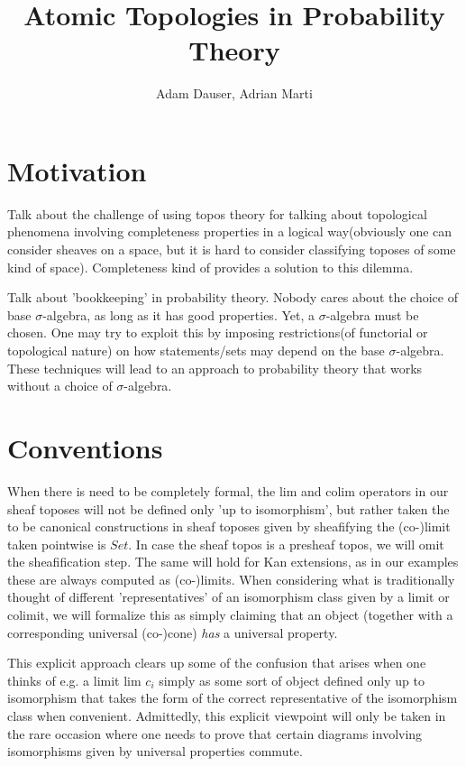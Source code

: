 \documentclass[a4paper]{amsproc}
\title{\textbf{Atomic Topologies in Probability Theory}}
\author{Adam Dauser, Adrian Marti}
\date{}
\theoremstyle{plain}
\theoremstyle{definition}
\theoremstyle{remark}
\numberwithin{equation}{section}
\begin{document}
\maketitle 

\section{Motivation}

Talk about the challenge of using topos theory for talking about topological phenomena involving completeness properties in a logical way(obviously one can consider sheaves on a space, but it is hard to consider classifying toposes of some kind of space). Completeness kind of provides a solution to this dilemma.

Talk about 'bookkeeping' in probability theory. Nobody cares about the choice of base $\sigma$-algebra, as long as it has good properties. Yet, a $\sigma$-algebra must be chosen. One may try to exploit this by imposing restrictions(of functorial or topological nature) on how statements/sets may depend on the base $\sigma$-algebra. These techniques will lead to an approach to probability theory that works without a choice of $\sigma$-algebra.

\section{Conventions} \label{conventions}

When there is need to be completely formal, the lim and colim operators in our sheaf toposes will not be defined only 'up to isomorphism', but rather taken the to be canonical constructions in sheaf toposes given by sheafifying the (co-)limit taken pointwise is $Set$. In case the sheaf topos is a presheaf topos, we will omit the sheafification step. The same will hold for Kan extensions, as in our examples these are always computed as (co-)limits. When considering what is traditionally thought of different 'representatives' of an isomorphism class given by a limit or colimit, we will formalize this as simply claiming that an object (together with a corresponding universal (co-)cone) \emph{has} a universal property.

This explicit approach clears up some of the confusion that arises when one thinks of e.g. a limit $\text{lim } c_i$ simply as some sort of object defined only up to isomorphism that takes the form of the correct representative of the isomorphism class when convenient. Admittedly, this explicit viewpoint will only be taken in the rare occasion where one needs to prove that certain diagrams involving isomorphisms given by universal properties commute.
\end{document}
